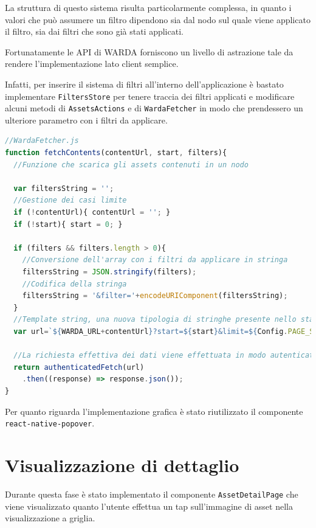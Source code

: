 La struttura di questo sistema risulta particolarmente complessa, in quanto i valori che può assumere un filtro dipendono sia dal nodo sul quale viene applicato il filtro, sia dai filtri che sono già stati applicati.

Fortunatamente le API di WARDA forniscono un livello di astrazione tale da rendere l'implementazione lato client semplice.

Infatti, per inserire il sistema di filtri all'interno dell'applicazione è bastato implementare \texttt{FiltersStore} per tenere traccia dei filtri applicati e modificare alcuni metodi di \texttt{AssetsActions} e di \texttt{WardaFetcher} in modo che prendessero un ulteriore parametro con i filtri da applicare.

\begin{lstlisting}[language=JavaScript, caption=WardaFetcher - Caricamento degli assets considerando i filtri]
//WardaFetcher.js
function fetchContents(contentUrl, start, filters){
  //Funzione che scarica gli assets contenuti in un nodo

  var filtersString = '';
  //Gestione dei casi limite
  if (!contentUrl){ contentUrl = ''; }
  if (!start){ start = 0; }

  if (filters && filters.length > 0){
    //Conversione dell'array con i filtri da applicare in stringa
    filtersString = JSON.stringify(filters);
    //Codifica della stringa
    filtersString = '&filter='+encodeURIComponent(filtersString);
  }
  //Template string, una nuova tipologia di stringhe presente nello standard ES6 di JavaScript, le variabili presenti all'interno del blocco ${ } vengono sostituite con il loro valore
  var url=`${WARDA_URL+contentUrl}?start=${start}&limit=${Config.PAGE_SIZE}${filtersString}`;

  //La richiesta effettiva dei dati viene effettuata in modo autenticato
  return authenticatedFetch(url)
    .then((response) => response.json());
}
\end{lstlisting}

Per quanto riguarda l'implementazione grafica è stato riutilizzato il componente \texttt{react-native-popover}.

\section{Visualizzazione di dettaglio}

Durante questa fase è stato implementato il componente \texttt{AssetDetailPage} che viene visualizzato quanto l'utente effettua un tap sull'immagine di asset nella visualizzazione a griglia. 

